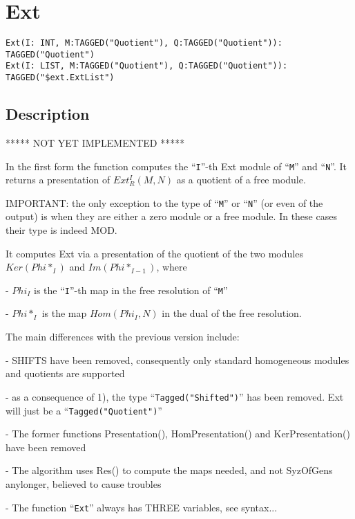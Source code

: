 \documentclass[a4paper]{mybook}
\newenvironment{command}{}{} %
\begin{document}
\section{Ext}
\label{Ext}
\begin{command} %


\begin{Verbatim}[label=syntax, rulecolor=\color{MidnightBlue},
frame=single]
Ext(I: INT, M:TAGGED("Quotient"), Q:TAGGED("Quotient")): TAGGED("Quotient")
Ext(I: LIST, M:TAGGED("Quotient"), Q:TAGGED("Quotient")): TAGGED("$ext.ExtList")
\end{Verbatim}


\subsection*{Description}

***** NOT YET IMPLEMENTED *****
\par 
In the first form the function computes the ``\verb&I&''-th Ext module of ``\verb&M&'' and ``\verb&N&''.
It returns a presentation of $Ext^I_R(M, N)$ as a quotient of a free module.
\par 
IMPORTANT: the only exception to the type of ``\verb&M&'' or ``\verb&N&'' (or even of the
output) is when they are either a zero module or a free module.
In these cases their type is indeed MOD.
\par 
It computes Ext via a presentation of the quotient of the two modules
$Ker(Phi*_I)$
and
$Im(Phi*_{I-1})$, where
\par 
  -   $Phi_I$   is the ``\verb&I&''-th map in the free resolution of ``\verb&M&''
  \par 
  -   $Phi*_I$   is the map $Hom(Phi_I, N)$
  in the dual of the free resolution.
\par 
The main differences with the previous version include:
\par 
- SHIFTS have been removed, consequently only standard homogeneous
  modules and quotients are supported
\par 
- as a consequence of 1), the type ``\verb&Tagged("Shifted")&'' has been
  removed. Ext will just be a ``\verb&Tagged("Quotient")&''
\par 
- The former functions Presentation(), HomPresentation() and
  KerPresentation() have been removed
\par 
- The algorithm uses Res() to compute the maps needed, and not
  SyzOfGens anylonger, believed to cause troubles
\par 
- The function ``\verb&Ext&'' always has THREE variables, see syntax...
\par 


\end{command}
\end{document}
